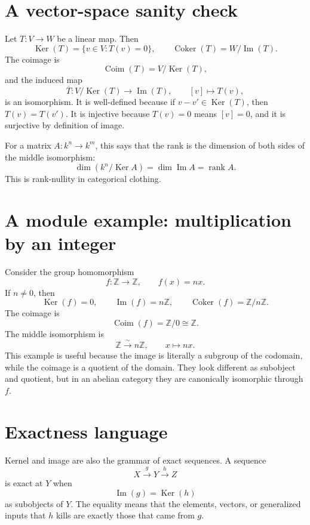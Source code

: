\section{A vector-space sanity check}

Let \(T:V\to W\) be a linear map.  Then
\[
  \operatorname{Ker}(T)=\{v\in V:T(v)=0\},
  \qquad
  \operatorname{Coker}(T)=W/\operatorname{Im}(T).
\]
The coimage is
\[
  \operatorname{Coim}(T)=V/\operatorname{Ker}(T),
\]
and the induced map
\[
  \overline T:V/\operatorname{Ker}(T)\to \operatorname{Im}(T),
  \qquad [v]\mapsto T(v),
\]
is an isomorphism.  It is well-defined because if \(v-v'\in\operatorname{Ker}(T)\), then \(T(v)=T(v')\).  It is injective because \(T(v)=0\) means \([v]=0\), and it is surjective by definition of image.

For a matrix \(A:k^n\to k^m\), this says that the rank is the dimension of both sides of the middle isomorphism:
\[
  \dim(k^n/\operatorname{Ker}A)=\dim \operatorname{Im}A=\operatorname{rank}A.
\]
This is rank-nullity in categorical clothing.

\section{A module example: multiplication by an integer}

Consider the group homomorphism
\[
  f:\mathbb Z\to\mathbb Z,
  \qquad f(x)=nx.
\]
If \(n\ne0\), then
\[
  \operatorname{Ker}(f)=0,
  \qquad
  \operatorname{Im}(f)=n\mathbb Z,
  \qquad
  \operatorname{Coker}(f)=\mathbb Z/n\mathbb Z.
\]
The coimage is
\[
  \operatorname{Coim}(f)=\mathbb Z/0\cong\mathbb Z.
\]
The middle isomorphism is
\[
  \mathbb Z\xrightarrow{\sim} n\mathbb Z,
  \qquad x\mapsto nx.
\]
This example is useful because the image is literally a subgroup of the codomain, while the coimage is a quotient of the domain.  They look different as subobject and quotient, but in an abelian category they are canonically isomorphic through \(f\).

\section{Exactness language}

Kernel and image are also the grammar of exact sequences.  A sequence
\[
  X\xrightarrow{g}Y\xrightarrow{h}Z
\]
is exact at \(Y\) when
\[
  \operatorname{Im}(g)=\operatorname{Ker}(h)
\]
as subobjects of \(Y\).  The equality means that the elements, vectors, or generalized inputs that \(h\) kills are exactly those that came from \(g\).

